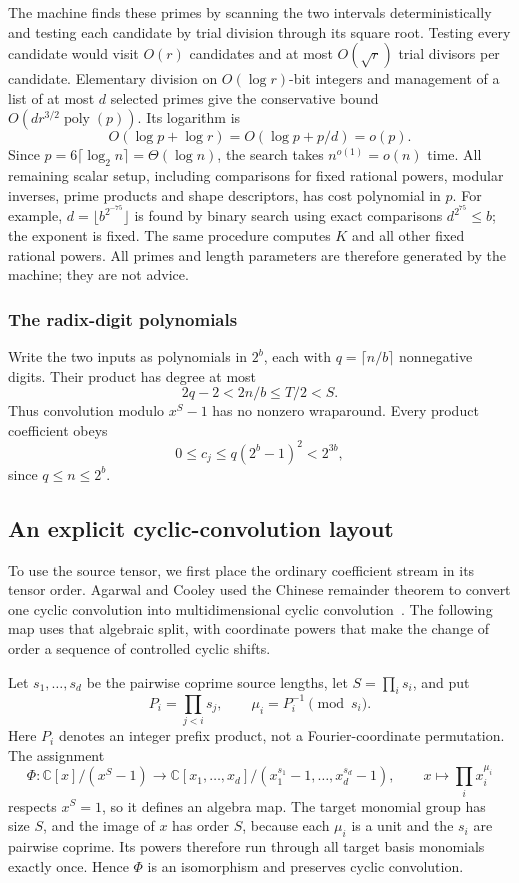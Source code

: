 The machine finds these primes by scanning the two intervals
deterministically and testing each candidate by trial division through
its square root. Testing every candidate would visit $O(r)$ candidates
and at most $O(\sqrt r)$ trial divisors per candidate. Elementary
division on $O(\log r)$-bit integers and management of a list of at most
$d$ selected primes give the conservative bound
$O(dr^{3/2}\operatorname{poly}(p))$. Its logarithm is
\[
 O(\log p+\log r)=O(\log p+p/d)=o(p).
\]
Since $p=6\lceil\log_2 n\rceil=\Theta(\log n)$, the search takes
$n^{o(1)}=o(n)$ time.
All remaining scalar setup, including comparisons for fixed rational
powers, modular inverses,
prime products and shape descriptors, has cost polynomial in $p$.
For example, $d=\lfloor b^{2^{-75}}\rfloor$ is found by binary search
using exact comparisons $d^{2^{75}}\le b$; the exponent is fixed.
The same procedure computes $K$ and all other fixed rational powers.
All primes and length parameters are therefore generated by the machine;
they are not advice.

\subsubsection{The radix-digit polynomials}

Write the two inputs as polynomials in $2^b$, each with
$q=\lceil n/b\rceil$ nonnegative digits.  Their product has degree at most
\[
 2q-2<2n/b\le T/2<S.
\]
Thus convolution modulo $x^S-1$ has no nonzero wraparound.  Every product
coefficient obeys
\begin{equation}\label{eq:capacity}
 0\le c_j\le q(2^b-1)^2<2^{3b},
\end{equation}
since $q\le n\le2^b$.

\subsection{An explicit cyclic-convolution layout}

To use the source tensor, we first place the ordinary coefficient stream
in its tensor order. Agarwal and Cooley used the Chinese remainder
theorem to convert one cyclic convolution into multidimensional cyclic
convolution~\cite{AgarwalCooley1977}. The following map uses that
algebraic split, with coordinate powers that make the change of order a
sequence of controlled cyclic shifts.

Let $s_1,\ldots,s_d$ be the pairwise coprime
source lengths, let $S=\prod_i s_i$, and put
\[
 P_i=\prod_{j<i}s_j,\qquad \mu_i=P_i^{-1}\pmod{s_i}.
\]
Here $P_i$ denotes an integer prefix product, not a Fourier-coordinate
permutation.  The assignment
\[
 \Phi:\mathbb C[x]/(x^S-1)\longrightarrow
 \mathbb C[x_1,\ldots,x_d]/(x_1^{s_1}-1,\ldots,x_d^{s_d}-1),
 \qquad x\longmapsto\prod_i x_i^{\mu_i}
\]
respects $x^S=1$, so it defines an algebra map.  The target monomial
group has size $S$, and the image of $x$ has order $S$, because each
$\mu_i$ is a unit and the $s_i$ are pairwise coprime.  Its powers
therefore run through all target basis monomials exactly once.  Hence
$\Phi$ is an isomorphism and preserves cyclic convolution.

